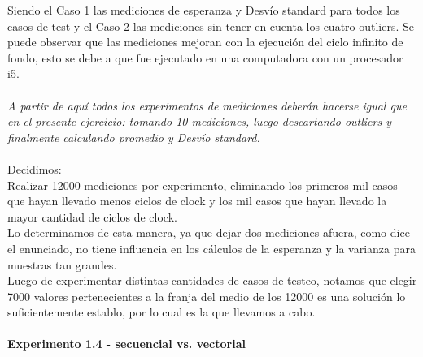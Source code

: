 \newpage
\indent Siendo el Caso 1 las mediciones de esperanza y Desvío standard para todos los casos de test y el Caso 2 las mediciones sin tener en cuenta los cuatro outliers. Se puede observar que las mediciones mejoran con la ejecuci\'on del ciclo infinito de fondo, esto se debe a que fue ejecutado en una computadora con un procesador i5. \\
\\
\textit{A partir de aquí todos los experimentos de mediciones deberán hacerse igual 
que en el presente ejercicio: tomando 10 mediciones, luego descartando 
outliers y finalmente calculando promedio y Desvío standard.}\\
\\
Decidimos: \\
Realizar 12000 mediciones por experimento, eliminando los primeros mil casos que hayan llevado menos ciclos de clock y los mil casos que hayan llevado la mayor cantidad de ciclos de clock. \\
Lo determinamos de esta manera, ya que dejar dos mediciones afuera, como dice el enunciado, no tiene influencia en los c\'alculos de la esperanza y la varianza para muestras tan grandes. \\
Luego de experimentar distintas cantidades de casos de testeo, notamos que elegir 7000 valores pertenecientes a la franja del medio de los 12000 es una soluci\'on lo suficientemente establo, por lo cual es la que llevamos a cabo. \\
\\
\noindent\textbf{Experimento 1.4 - secuencial vs. vectorial}

